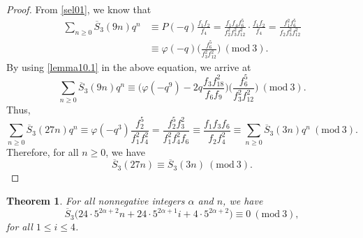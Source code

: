 \documentclass[12pt]{amsart}
\theoremstyle{plain}
\newtheorem{theorem}{Theorem}[section]
\theoremstyle{definition}
\begin{document}
\begin{proof}
From \eqref{sel01}, we know that
\begin{align*}
\sum_{n \geq 0} \overline{S}_{3}(9n) q^{n} &\equiv P(-q) \frac{f_1 f_2}{f_{4}} = \frac{f_1 f_4 f_6^5}{f_2^2 f_3^2 f_{12}^2}  \cdot \frac{f_1 f_2}{f_{4}} = \frac{f_1^2 f_6^5}{f_2 f_3^2 f_{12}^2} \\
&\equiv  \varphi(-q) \bigg( \frac{ f_6^5}{ f_3^2 f_{12}^2} \bigg)
\ (\mathrm{mod} \ 3).
\end{align*}
By using \eqref{lemma10.1} in the above equation, we arrive at
\[
\sum_{n \geq 0} \overline{S}_{3}(9n) q^{n} \equiv \bigg(  \varphi(-q^9) -2q\dfrac{f_{3}f_{18}^{2}}{f_{6}f_{9}} \bigg) \bigg( \frac{ f_6^5}{ f_3^2 f_{12}^2} \bigg) \ (\mathrm{mod} \ 3).
\]
Thus, 
\[
\sum_{n \geq 0} \overline{S}_{3}(27n) q^{n} \equiv  \varphi(-q^3) \frac{ f_2^5}{ f_1^2 f_{4}^2} =  \frac{ f_2^5 f_3^2}{ f_1^2 f_{4}^2 f_6} \equiv \frac{f_1 f_3 f_6}{f_2 f_4^2} \equiv \sum_{n \geq 0} \overline{S}_{3}(3n) q^{n}  \ (\mathrm{mod} \ 3).
\]
Therefore, for all $n\geq 0$, we have
\[
\overline{S}_{3}(27n) \equiv  \overline{S}_{3}(3n) \ (\mathrm{mod} \ 3).
\]
\end{proof}


\begin{theorem} \label{thm3}  For all nonnegative integers $\alpha$ and  $n$, we have
\begin{equation*}
\overline{S}_{3} \bigl( 24\cdot 5^{2\alpha+2}n+24\cdot 5^{2\alpha+1}i +  4 \cdot 5^{2\alpha+2} \bigl) \equiv 0 \ (\mathrm{mod} \ 3), 
\end{equation*}
for all $1\leq i \leq 4$.
\end{theorem}
\end{document}
